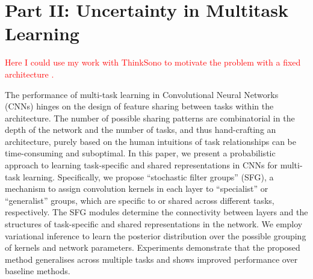%
%
%
%
%
%
%
%
\chapter{Part II: Uncertainty in Multitask Learning } \label{chapter:multitaskuncertainty_part2}

\textcolor{red}{Here I could use my work with ThinkSono to motivate the problem with a fixed architecture \cite{tanno2018autodvt}.}

The performance of multi-task learning in Convolutional Neural Networks (CNNs) hinges on the design of feature sharing between tasks within the architecture. The number of possible sharing patterns are combinatorial in the depth of the network and the number of tasks, and thus hand-crafting an architecture, purely based on the human intuitions of task relationships can be time-consuming and suboptimal. In this paper, we present a probabilistic approach to learning task-specific and shared representations in CNNs for multi-task learning. Specifically, we propose ``stochastic filter groups'' (SFG), a mechanism to assign convolution kernels in each layer to ``specialist'' or ``generalist'' groups, which are specific to or shared across different tasks, respectively. The SFG modules determine the connectivity between layers and the structures of task-specific and shared representations in the network. We employ variational inference to learn the posterior distribution over the possible grouping of kernels and network parameters. Experiments demonstrate that the proposed method generalises across multiple tasks and shows improved performance over baseline methods. 

